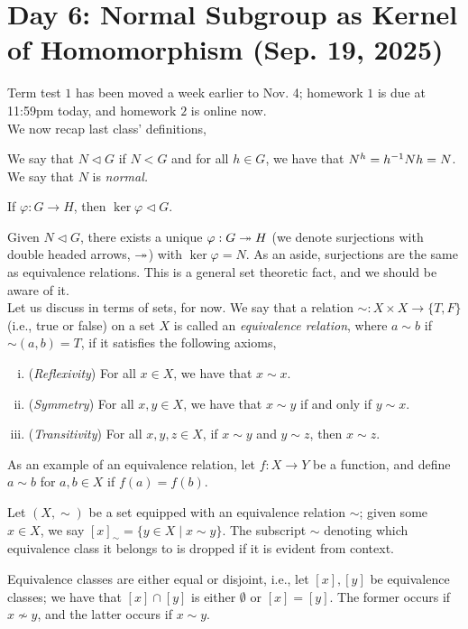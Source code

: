\section{Day 6: Normal Subgroup as Kernel of Homomorphism (Sep. 19, 2025)}
Term test $1$ has been moved a week earlier to Nov. 4; homework $1$ is due at 11:59pm today, and homework $2$ is online now.
\\[8pt]
We now recap last class' definitions,
\begin{definition}
    We say that $N \lhd G$ if $N < G$ and for all $h \in G$, we have that $N^h = h ^{-1} N h = N$. We say that $N$ is \textit{normal.}
\end{definition}
\begin{claim}
    If $\varphi : G \to H$, then $\ker \varphi \lhd G$.
\end{claim}
\noindent Given $N \lhd G$, there exists a unique $\varphi : G \twoheadrightarrow H$ (we denote surjections with double headed arrows, $\twoheadrightarrow$) with $\ker \varphi = N$. As an aside, surjections are the same as equivalence relations. This is a general set theoretic fact, and we should be aware of it.
\\[8pt]
Let us discuss in terms of sets, for now. We say that a relation $\sim : X \times X \to \{T, F\}$ (i.e., true or false) on a set $X$ is called an \textit{equivalence relation}, where $a \sim b$ if $\sim(a, b) = T$, if it satisfies the following axioms,
\begin{enumerate}[(i)]
    \item (\textit{Reflexivity}) For all $x \in X$, we have that $x \sim x$.
    \item (\textit{Symmetry}) For all $x, y \in X$, we have that $x \sim y$ if and only if $y \sim x$.
    \item (\textit{Transitivity}) For all $x, y, z \in X$, if $x \sim y$ and $y \sim z$, then $x \sim z$.
\end{enumerate}
\noindent As an example of an equivalence relation, let $f : X \to Y$ be a function, and define $a \sim b$ for $a, b \in X$ if $f(a) = f(b)$.
\begin{definition}
    Let $(X, \sim)$ be a set equipped with an equivalence relation $\sim$; given some $x \in X$, we say $[x]_\sim  = \{y \in X \mid x \sim y\}$. The subscript $\sim$ denoting which equivalence class it belongs to is dropped if it is evident from context.
\end{definition}
\begin{claim}
    Equivalence classes are either equal or disjoint, i.e., let $[x], [y]$ be equivalence classes; we have that $[x] \cap [y]$ is either $\emptyset$ or $[x] = [y]$. The former occurs if $x \not\sim y$, and the latter occurs if $x \sim y$.
\end{claim}
